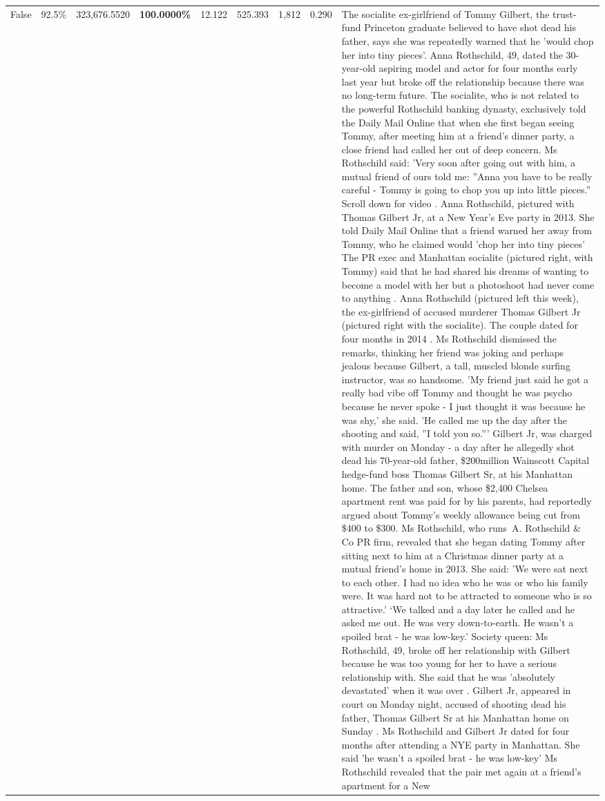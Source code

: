 \begin{table}[H]
\begin{tabular}{lllrlllll}
False & 92.5\% & 323,676.5520 & \bfseries \color{red} 100.0000\% & 12.122 & 525.393 & 1,812 & 0.290 & The socialite ex-girlfriend of Tommy Gilbert, the trust-fund Princeton graduate believed to have shot dead his father, says she was repeatedly warned that he 'would chop her into tiny pieces'. Anna Rothschild, 49, dated the 30-year-old aspiring model and actor for four months early last year but broke off the relationship because there was no long-term future. The socialite, who is not related to the powerful Rothschild banking dynasty, exclusively told the Daily Mail Online that when she first began seeing Tommy, after meeting him at a friend's dinner party, a close friend had called her out of deep concern. Ms Rothschild said: 'Very soon after going out with him, a mutual friend of ours told me: ''Anna you have to be really careful - Tommy is going to chop you up into little pieces.'' Scroll down for video . Anna Rothschild, pictured with Thomas Gilbert Jr, at a New Year's Eve party in 2013. She told Daily Mail Online that a friend warned her away from Tommy, who he claimed would 'chop her into tiny pieces' The PR exec and Manhattan socialite (pictured right, with Tommy) said that he had shared his dreams of wanting to become a model with her but a photoshoot had never come to anything . Anna Rothschild (pictured left this week), the ex-girlfriend of accused murderer Thomas Gilbert Jr (pictured right with the socialite). The couple dated for four months in 2014 . Ms Rothschild dismissed the remarks, thinking her friend was joking and perhaps jealous because Gilbert, a tall, muscled blonde surfing instructor, was so handsome. 'My friend just said he got a really bad vibe off Tommy and thought he was psycho because he never spoke - I just thought it was because he was shy,' she said. 'He called me up the day after the shooting and said, ''I told you so.''' Gilbert Jr, was charged with murder on Monday - a day after he allegedly shot dead his 70-year-old father, \$200million Wainscott Capital hedge-fund boss Thomas Gilbert Sr, at his Manhattan home. The father and son, whose \$2,400 Chelsea apartment rent was paid for by his parents, had reportedly argued about Tommy's weekly allowance being cut from \$400 to \$300. Ms Rothschild, who runs A. Rothschild \& Co PR firm, revealed that she began dating Tommy after sitting next to him at a Christmas dinner party at a mutual friend's home in 2013. She said: 'We were sat next to each other. I had no idea who he was or who his family were. It was hard not to be attracted to someone who is so attractive.' ‘We talked and a day later he called and he asked me out. He was very down-to-earth. He wasn’t a spoiled brat - he was low-key.’ Society queen: Ms Rothschild, 49, broke off her relationship with Gilbert because he was too young for her to have a serious relationship with. She said that he was 'absolutely devastated' when it was over . Gilbert Jr, appeared in court on Monday night, accused of shooting dead his father, Thomas Gilbert Sr at his Manhattan home on Sunday . Ms Rothschild and Gilbert Jr dated for four months after attending a NYE party in Manhattan. She said 'he wasn't a spoiled brat - he was low-key' Ms Rothschild revealed that the pair met again at a friend’s apartment for a New 
\end{tabular}
\end{table}
